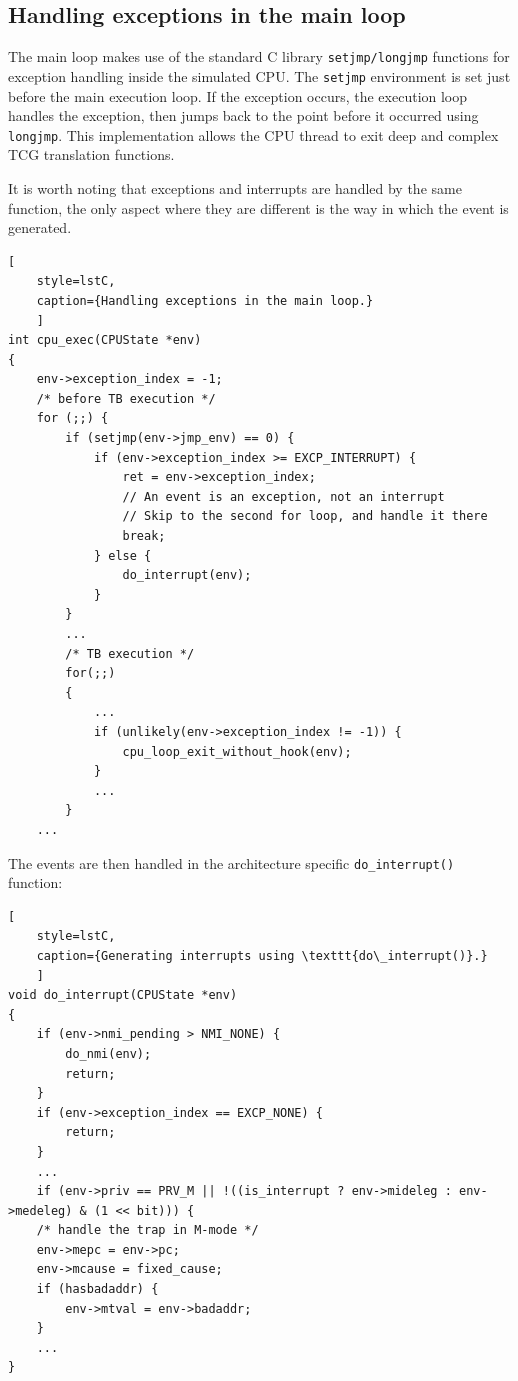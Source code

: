 \subsection*{Handling exceptions in the main loop}

The main loop makes use of the standard C library \texttt{setjmp/longjmp} functions for exception handling inside the simulated CPU.
The \texttt{setjmp} environment is set just before the main execution loop. If the exception occurs, the execution loop handles
the exception, then jumps back to the point before it occurred using \texttt{longjmp}. This implementation allows
the CPU thread to exit deep and complex TCG translation functions.

It is worth noting that exceptions and interrupts are handled by the same function, the only aspect where they are
different is the way in which the event is generated.

\pagebreak

\begin{lstlisting}[
    style=lstC,
    caption={Handling exceptions in the main loop.}
    ]
int cpu_exec(CPUState *env)
{
    env->exception_index = -1;
    /* before TB execution */
    for (;;) {
        if (setjmp(env->jmp_env) == 0) {
            if (env->exception_index >= EXCP_INTERRUPT) {
                ret = env->exception_index;
                // An event is an exception, not an interrupt
                // Skip to the second for loop, and handle it there
                break;
            } else {
                do_interrupt(env);
            }
        }
        ...
        /* TB execution */
        for(;;)
        {
            ...
            if (unlikely(env->exception_index != -1)) {
                cpu_loop_exit_without_hook(env);
            }
            ...
        }
    ...
\end{lstlisting}

\noindent
The events are then handled in the architecture specific \texttt{do\_interrupt()} function:

\begin{lstlisting}[
    style=lstC,
    caption={Generating interrupts using \texttt{do\_interrupt()}.}
    ]
void do_interrupt(CPUState *env)
{
    if (env->nmi_pending > NMI_NONE) {
        do_nmi(env);
        return;
    }
    if (env->exception_index == EXCP_NONE) {
        return;
    }
    ...
    if (env->priv == PRV_M || !((is_interrupt ? env->mideleg : env->medeleg) & (1 << bit))) {
    /* handle the trap in M-mode */
    env->mepc = env->pc;
    env->mcause = fixed_cause;
    if (hasbadaddr) {
        env->mtval = env->badaddr;
    }
    ...
}
\end{lstlisting}
